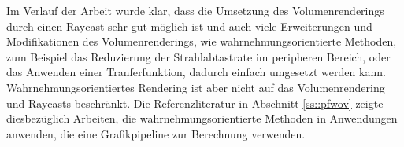Im Verlauf der Arbeit wurde klar, dass die Umsetzung des Volumenrenderings durch einen Raycast sehr gut möglich ist und auch viele Erweiterungen und Modifikationen des Volumenrenderings, wie wahrnehmungsorientierte Methoden, zum Beispiel das Reduzierung der Strahlabtastrate im peripheren Bereich, oder das Anwenden einer Tranferfunktion, dadurch einfach umgesetzt werden kann.
Wahrnehmungsorientiertes Rendering ist aber nicht auf das Volumenrendering und Raycasts beschränkt.
Die Referenzliteratur in Abschnitt \ref{ss::pfwov} zeigte diesbezüglich Arbeiten, die wahrnehmungsorientierte Methoden in Anwendungen anwenden, die eine Grafikpipeline zur Berechnung verwenden.
